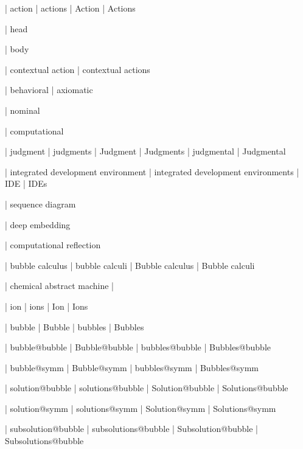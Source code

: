  | action
 | actions
 | Action
 | Actions



 | head

 | body

 | contextual action
 | contextual actions
 
 | behavioral
 | axiomatic

 | nominal

 | computational

 | judgment
 | judgments
 | Judgment
 | Judgments
 | judgmental
 | Judgmental


 | integrated development environment
 | integrated development environments
 | IDE
 | IDEs

 | sequence diagram

 | deep embedding

 | computational reflection


 | bubble calculus
 | bubble calculi
 | Bubble calculus
 | Bubble calculi

 | chemical abstract machine
 | \cham
 
 | ion
 | ions
 | Ion
 | Ions

 | bubble
 | Bubble
 | bubbles
 | Bubbles

 | bubble@bubble
 | Bubble@bubble
 | bubbles@bubble
 | Bubbles@bubble

 | bubble@symm
 | Bubble@symm
 | bubbles@symm
 | Bubbles@symm

 | solution@bubble
 | solutions@bubble
 | Solution@bubble
 | Solutions@bubble

 | solution@symm
 | solutions@symm
 | Solution@symm
 | Solutions@symm

 | subsolution@bubble
 | subsolutions@bubble
 | Subsolution@bubble
 | Subsolutions@bubble

